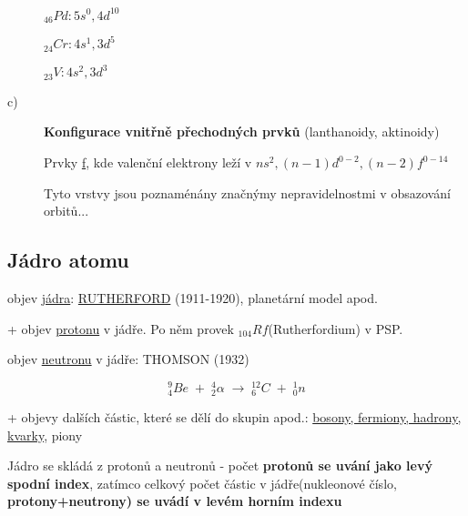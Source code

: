 \begin{description}
\begin{multicols}{2}
            \(_{46}Pd: 5s^0, 4d^{10}\)
    
            \(_{24}Cr: 4s^1, 3d^{5}\)
    
            \(_{23}V: 4s^2, 3d^{3}\)
        \end{multicols}

    \item[c)] \textbf{Konfigurace vnitřně přechodných prvků} (lanthanoidy, aktinoidy)

        Prvky \underline{f}, kde valenční elektrony leží v \underline{$ns^2, (n-1)d^{0-2}, (n-2)f^{0-14}$}

        Tyto vrstvy jsou poznaménány značnýmy nepravidelnostmi v obsazování orbitů...

\end{description}

\subsection{Jádro atomu}
objev \underline{jádra}: \underline{RUTHERFORD} (1911-1920), planetární model apod.

+ objev \underline{protonu} v jádře. Po něm provek $_{104}Rf$(Rutherfordium) v PSP.

\vspace{1em}

objev \underline{neutronu} v jádře: THOMSON (1932)

\[^9_4Be\; + \;^4_2\alpha \; \rightarrow \; ^{12}_6C \; + \;^1_0n\]

+ objevy dalších částic, které se dělí do skupin apod.: \underline{bosony, fermiony, hadrony, kvarky}, piony

\vspace{1em}

Jádro se skládá z protonů a neutronů - počet \textbf{protonů se uvání jako levý spodní index}, zatímco celkový počet částic v jádře(nukleonové číslo, \textbf{protony+neutrony) se uvádí v levém horním indexu}